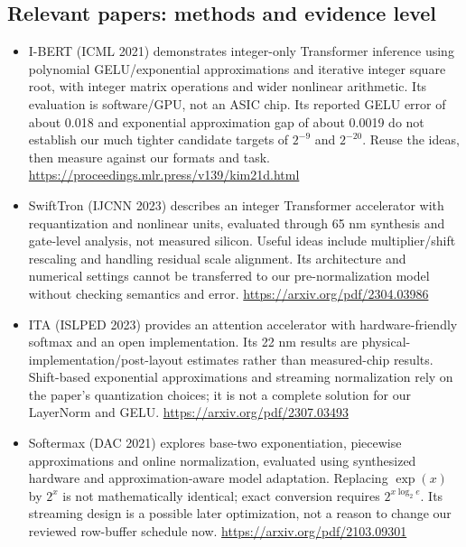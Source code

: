 \subsection{Relevant papers: methods and evidence level}
\begin{itemize}
\item I-BERT (ICML 2021) demonstrates integer-only Transformer inference using polynomial GELU/exponential approximations and iterative integer square root, with integer matrix operations and wider nonlinear arithmetic. Its evaluation is software/GPU, not an ASIC chip. Its reported GELU error of about 0.018 and exponential approximation gap of about 0.0019 do not establish our much tighter candidate targets of $2^{-9}$ and $2^{-20}$. Reuse the ideas, then measure against our formats and task. \url{https://proceedings.mlr.press/v139/kim21d.html}
\item SwiftTron (IJCNN 2023) describes an integer Transformer accelerator with requantization and nonlinear units, evaluated through 65 nm synthesis and gate-level analysis, not measured silicon. Useful ideas include multiplier/shift rescaling and handling residual scale alignment. Its architecture and numerical settings cannot be transferred to our pre-normalization model without checking semantics and error. \url{https://arxiv.org/pdf/2304.03986}
\item ITA (ISLPED 2023) provides an attention accelerator with hardware-friendly softmax and an open implementation. Its 22 nm results are physical-implementation/post-layout estimates rather than measured-chip results. Shift-based exponential approximations and streaming normalization rely on the paper's quantization choices; it is not a complete solution for our LayerNorm and GELU. \url{https://arxiv.org/pdf/2307.03493}
\item Softermax (DAC 2021) explores base-two exponentiation, piecewise approximations and online normalization, evaluated using synthesized hardware and approximation-aware model adaptation. Replacing $\exp(x)$ by $2^x$ is not mathematically identical; exact conversion requires $2^{x\log_2 e}$. Its streaming design is a possible later optimization, not a reason to change our reviewed row-buffer schedule now. \url{https://arxiv.org/pdf/2103.09301}
\end{itemize}


